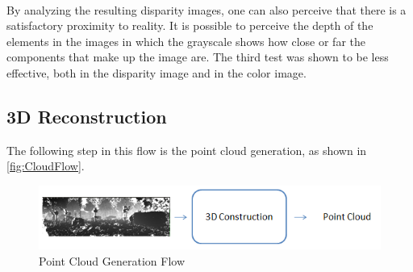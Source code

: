 \begin{figure}[H]
{    
    }
    \mbox{%
    \qquad
    }
  \label{teste3-4result}
\end{figure}

    By analyzing the resulting disparity images, one can also perceive that there is a satisfactory proximity to reality. It is possible to perceive the depth of the elements in the images in which the grayscale shows how close or far the components that make up the image are. The third test was shown to be less effective, both in the disparity image and in the color image.
    
\subsection{3D Reconstruction}
    
    The following step in this flow is the point cloud generation, as shown in \autoref{fig:CloudFlow}. 

    \begin{figure}[H]
        \caption{
        \label{fig:CloudFlow}
            Point Cloud Generation Flow}
        \begin{center}
        \includegraphics[width=1\textwidth]{images/CloudFlow.png}
        \end{center}
    \end{figure}
    
